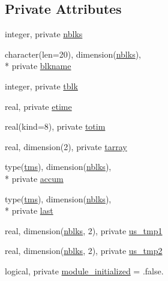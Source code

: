 \subsection*{Private Attributes}
\begin{DoxyCompactItemize}
\item 
integer, private \hyperlink{classfv__timing__mod_a8f78bb855cc4e52f3308ab25fa4498a5}{nblks}
\item 
character(len=20), dimension(\hyperlink{classfv__timing__mod_a8f78bb855cc4e52f3308ab25fa4498a5}{nblks}), \\*
private \hyperlink{classfv__timing__mod_a31560d7c7691483d291cebc1466fbbef}{blkname}
\item 
integer, private \hyperlink{classfv__timing__mod_aaeddb0efd1e02edd882b6f325ad57047}{tblk}
\item 
real, private \hyperlink{classfv__timing__mod_add9c7186606182a5850e936cc88bf664}{etime}
\item 
real(kind=8), private \hyperlink{classfv__timing__mod_a5460a631553f37f69e3f87d4725fdb83}{totim}
\item 
real, dimension(2), private \hyperlink{classfv__timing__mod_a18b8ce2f3249b1cfb378a40c048b615b}{tarray}
\item 
type(\hyperlink{structfv__timing__mod_1_1tms}{tms}), dimension(\hyperlink{classfv__timing__mod_a8f78bb855cc4e52f3308ab25fa4498a5}{nblks}), \\*
private \hyperlink{classfv__timing__mod_ad37e58fa4398fd8e2e0c2ac7cfc82782}{accum}
\item 
type(\hyperlink{structfv__timing__mod_1_1tms}{tms}), dimension(\hyperlink{classfv__timing__mod_a8f78bb855cc4e52f3308ab25fa4498a5}{nblks}), \\*
private \hyperlink{classfv__timing__mod_aef40c4c1d0162a76cde3d6461a46d91b}{last}
\item 
real, dimension(\hyperlink{classfv__timing__mod_a8f78bb855cc4e52f3308ab25fa4498a5}{nblks}, 2), private \hyperlink{classfv__timing__mod_ab8d555b44911d2782f74f538a6eaa432}{us\-\_\-tmp1}
\item 
real, dimension(\hyperlink{classfv__timing__mod_a8f78bb855cc4e52f3308ab25fa4498a5}{nblks}, 2), private \hyperlink{classfv__timing__mod_a0bf15deed4130bdab7908785c80d9e70}{us\-\_\-tmp2}
\item 
logical, private \hyperlink{classfv__timing__mod_aa0f0480c2acfb9198a47a6bfd90e91c7}{module\-\_\-initialized} = .false.
\end{DoxyCompactItemize}



